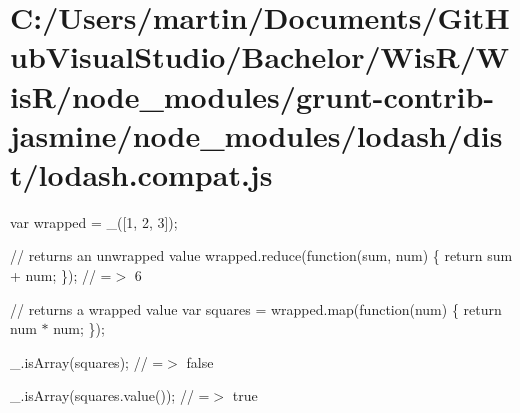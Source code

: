 \hypertarget{_c_1_2_users_2martin_2_documents_2_git_hub_visual_studio_2_bachelor_2_wis_r_2_wis_r_2node_modulee415aeb2dbdd42fcbde611cc30319a59}{}\section{C\+:/\+Users/martin/\+Documents/\+Git\+Hub\+Visual\+Studio/\+Bachelor/\+Wis\+R/\+Wis\+R/node\+\_\+modules/grunt-\/contrib-\/jasmine/node\+\_\+modules/lodash/dist/lodash.\+compat.\+js}
var wrapped = \+\_\+(\mbox{[}1, 2, 3\mbox{]});

// returns an unwrapped value wrapped.\+reduce(function(sum, num) \{ return sum + num; \}); // =$>$ 6

// returns a wrapped value var squares = wrapped.\+map(function(num) \{ return num $\ast$ num; \});

\+\_\+.\+is\+Array(squares); // =$>$ false

\+\_\+.\+is\+Array(squares.\+value()); // =$>$ true



